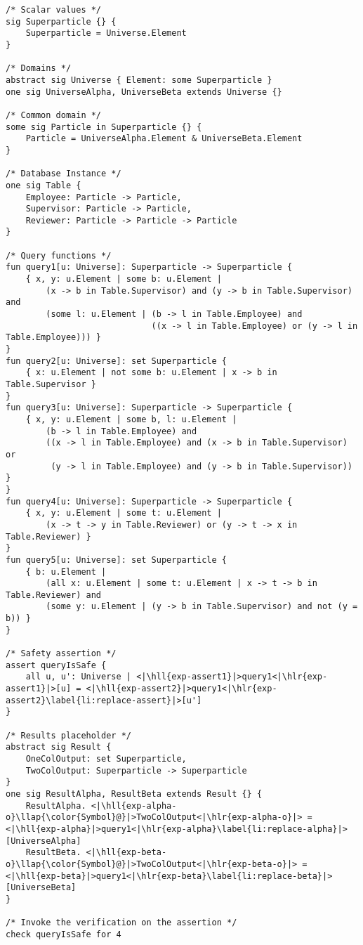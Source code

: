 \begin{lstlisting}[language=alloy,float,basicstyle={\footnotesize\ttfamily},caption={The complete Alloy program which verifies queries {\protect $Q_1$ through $Q_5$} as defined earlier in \sectionref{sec:experiment}. To verify the safety of other query functions, some portions of the code (shown highlighted) needs to be modified.},label={src:experiment},aboveskip=0pc,belowskip=0pc]
/* Scalar values */
sig Superparticle {} {
	Superparticle = Universe.Element
}

/* Domains */
abstract sig Universe { Element: some Superparticle }
one sig UniverseAlpha, UniverseBeta extends Universe {}

/* Common domain */
some sig Particle in Superparticle {} {
	Particle = UniverseAlpha.Element & UniverseBeta.Element
}

/* Database Instance */
one sig Table {
    Employee: Particle -> Particle,
    Supervisor: Particle -> Particle,
    Reviewer: Particle -> Particle -> Particle
}

/* Query functions */
fun query1[u: Universe]: Superparticle -> Superparticle {
    { x, y: u.Element | some b: u.Element |
        (x -> b in Table.Supervisor) and (y -> b in Table.Supervisor) and
        (some l: u.Element | (b -> l in Table.Employee) and
                             ((x -> l in Table.Employee) or (y -> l in Table.Employee))) }
}
fun query2[u: Universe]: set Superparticle {
    { x: u.Element | not some b: u.Element | x -> b in Table.Supervisor }
}
fun query3[u: Universe]: Superparticle -> Superparticle {
    { x, y: u.Element | some b, l: u.Element |
        (b -> l in Table.Employee) and
        ((x -> l in Table.Employee) and (x -> b in Table.Supervisor) or
         (y -> l in Table.Employee) and (y -> b in Table.Supervisor)) }
}
fun query4[u: Universe]: Superparticle -> Superparticle {
    { x, y: u.Element | some t: u.Element |
        (x -> t -> y in Table.Reviewer) or (y -> t -> x in Table.Reviewer) }
}
fun query5[u: Universe]: set Superparticle {
    { b: u.Element |
        (all x: u.Element | some t: u.Element | x -> t -> b in Table.Reviewer) and
        (some y: u.Element | (y -> b in Table.Supervisor) and not (y = b)) }
}

/* Safety assertion */
assert queryIsSafe {
    all u, u': Universe | <|\hll{exp-assert1}|>query1<|\hlr{exp-assert1}|>[u] = <|\hll{exp-assert2}|>query1<|\hlr{exp-assert2}\label{li:replace-assert}|>[u']
}

/* Results placeholder */
abstract sig Result {
    OneColOutput: set Superparticle,
    TwoColOutput: Superparticle -> Superparticle
}
one sig ResultAlpha, ResultBeta extends Result {} {
    ResultAlpha. <|\hll{exp-alpha-o}\llap{\color{Symbol}@}|>TwoColOutput<|\hlr{exp-alpha-o}|> = <|\hll{exp-alpha}|>query1<|\hlr{exp-alpha}\label{li:replace-alpha}|>[UniverseAlpha]
    ResultBeta. <|\hll{exp-beta-o}\llap{\color{Symbol}@}|>TwoColOutput<|\hlr{exp-beta-o}|> = <|\hll{exp-beta}|>query1<|\hlr{exp-beta}\label{li:replace-beta}|>[UniverseBeta]
}

/* Invoke the verification on the assertion */
check queryIsSafe for 4
\end{lstlisting}

